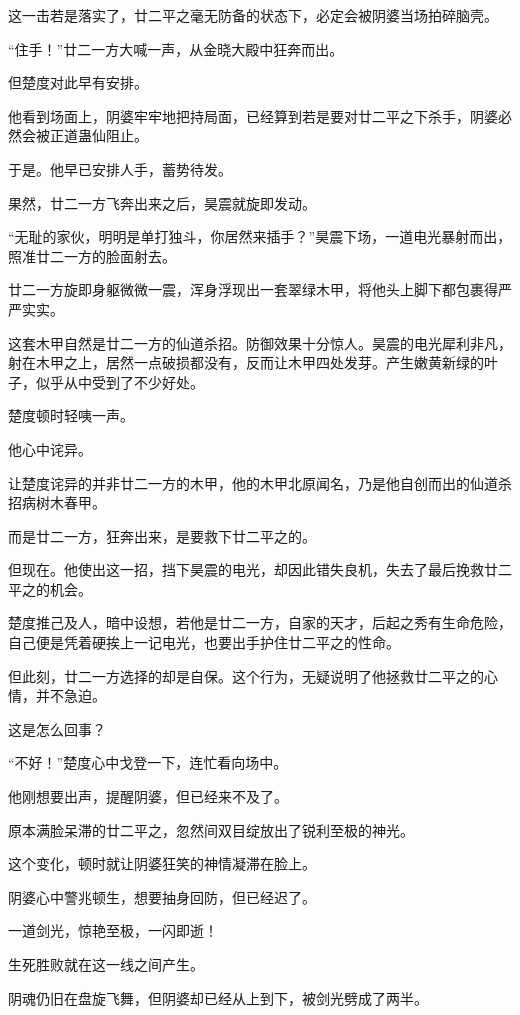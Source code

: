 \begin{this_body}
这一击若是落实了，廿二平之毫无防备的状态下，必定会被阴婆当场拍碎脑壳。

“住手！”廿二一方大喊一声，从金晓大殿中狂奔而出。

但楚度对此早有安排。

他看到场面上，阴婆牢牢地把持局面，已经算到若是要对廿二平之下杀手，阴婆必然会被正道蛊仙阻止。

于是。他早已安排人手，蓄势待发。

果然，廿二一方飞奔出来之后，昊震就旋即发动。

“无耻的家伙，明明是单打独斗，你居然来插手？”昊震下场，一道电光暴射而出，照准廿二一方的脸面射去。

廿二一方旋即身躯微微一震，浑身浮现出一套翠绿木甲，将他头上脚下都包裹得严严实实。

这套木甲自然是廿二一方的仙道杀招。防御效果十分惊人。昊震的电光犀利非凡，射在木甲之上，居然一点破损都没有，反而让木甲四处发芽。产生嫩黄新绿的叶子，似乎从中受到了不少好处。

楚度顿时轻咦一声。

他心中诧异。

让楚度诧异的并非廿二一方的木甲，他的木甲北原闻名，乃是他自创而出的仙道杀招病树木春甲。

而是廿二一方，狂奔出来，是要救下廿二平之的。

但现在。他使出这一招，挡下昊震的电光，却因此错失良机，失去了最后挽救廿二平之的机会。

楚度推己及人，暗中设想，若他是廿二一方，自家的天才，后起之秀有生命危险，自己便是凭着硬挨上一记电光，也要出手护住廿二平之的性命。

但此刻，廿二一方选择的却是自保。这个行为，无疑说明了他拯救廿二平之的心情，并不急迫。

这是怎么回事？

“不好！”楚度心中戈登一下，连忙看向场中。

他刚想要出声，提醒阴婆，但已经来不及了。

原本满脸呆滞的廿二平之，忽然间双目绽放出了锐利至极的神光。

这个变化，顿时就让阴婆狂笑的神情凝滞在脸上。

阴婆心中警兆顿生，想要抽身回防，但已经迟了。

一道剑光，惊艳至极，一闪即逝！

生死胜败就在这一线之间产生。

阴魂仍旧在盘旋飞舞，但阴婆却已经从上到下，被剑光劈成了两半。


\end{this_body}
